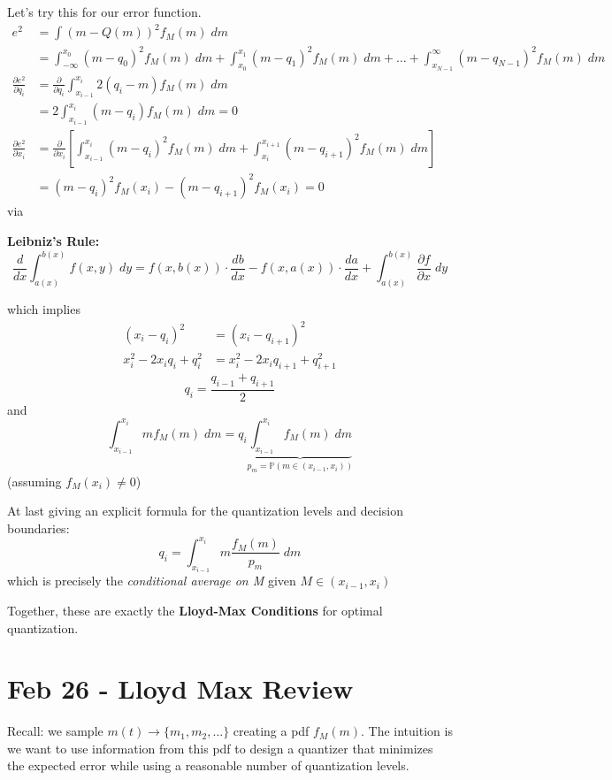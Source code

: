 \documentclass[12pt]{report}
\renewcommand{\P}{\mathbb{P}}
\newcommand*{\tbf}[1]{\ifmmode\mathbf{#1}\else\textbf{#1}\fi}
\newenvironment*{proposition}[1][gray]{
    \begin{tcolorbox}[
        parbox=false,
        colback=#1!5!white,
        colframe=#1!75!black,
        breakable
    ]}
    {\end{tcolorbox}}
\begin{document}
Let's try this for our error function.
\begin{align*}
    e^2 &= \int (m - Q(m))^2 f_M(m)\; dm\\ 
    &= \int_{-\infty}^{x_0}(m - q_0)^2 f_M(m)\; dm + \int_{x_0}^{x_1} (m - q_1)^2 f_M(m)\; dm + \dots + \int_{x_{N-1}}^{\infty} (m - q_{N-1})^2 f_M(m)\; dm\\ 
    \frac{\partial e^2}{\partial q_i} &= \frac{\partial}{\partial q_i} \int_{x_{i-1}}^{x_i} 2(q_i - m) f_M(m)\; dm\\ 
    &= 2 \int_{x_{i-1}}^{x_i} (m - q_i) f_M(m)\; dm = 0\\ 
    \frac{\partial e^2}{\partial x_i} &= \frac{\partial}{\partial x_i} \left[\int_{x_{i-1}}^{x_i} (m - q_i)^2 f_M(m)\; dm + \int_{x_i}^{x_{i+1}} (m - q_{i+1})^2 f_M(m)\; dm\right]\\
    &= (m - q_i)^2 f_M(x_i) - (m - q_{i+1})^2 f_M(x_i) = 0
\end{align*}
via 
\begin{proposition}
    \textbf{Leibniz's Rule:} 
    \[\frac{d}{dx} \int_{a(x)}^{b(x)} f(x, y)\; dy = f(x, b(x)) \cdot \frac{db}{dx} - f(x, a(x)) \cdot \frac{da}{dx} + \int_{a(x)}^{b(x)} \frac{\partial f}{\partial x}\; dy\]
\end{proposition}
which implies 
\begin{align*}
    (x_i - q_i)^2 &= (x_i - q_{i+1})^2 \\
    x_i^2 - 2 x_i q_i + q_i^2 &= x_i^2 - 2 x_i q_{i+1} + q_{i+1}^2
\end{align*}
\[\boxed{q_i = \frac{q_{i-1} + q_{i+1}}{2}}\]
and 
\[
    \int_{x_{i-1}}^{x_i} m f_M(m)\; dm = q_i \underbrace{\int_{x_{i-1}}^{x_i} f_M(m)\; dm}_{p_m = \P(m \in (x_{i-1}, x_i))}
\]
(assuming $f_M(x_i) \neq 0$) 

At last giving an explicit formula for the quantization levels and decision boundaries:
\[\boxed{q_i = \int_{x_{i-1}}^{x_i} m \frac{f_M(m)}{p_m}\; dm}\]
which is precisely the \emph{conditional average on M} given $M \in (x_{i-1}, x_i)$

Together, these are exactly the \tbf{Lloyd-Max Conditions} for optimal quantization. 

\section{Feb 26 - Lloyd Max Review}

Recall: we sample $m(t) \to \{m_1, m_2, \dots\}$ creating a pdf $f_M(m)$. The intuition is we want to use information from this pdf to design a quantizer that minimizes the expected error while using a reasonable number of quantization levels.
\end{document}
